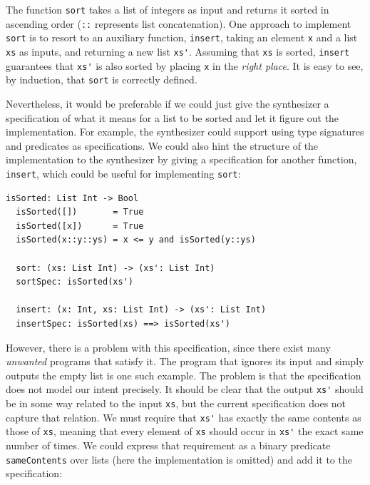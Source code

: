 \noindent
The function \lstinline{sort} takes a list of integers as input and returns
it sorted in ascending order (\lstinline{::} represents list concatenation).
One approach to implement \lstinline{sort} is to resort to an auxiliary
function, \lstinline{insert}, taking an element \lstinline{x} and a list
\lstinline{xs} as inputs, and returning a new list \lstinline{xs'}.
Assuming that \lstinline{xs} is sorted, \lstinline{insert} guarantees that
\lstinline{xs'} is also sorted by placing \lstinline{x} in the \textit{right
  place}.
It is easy to see, by induction, that \lstinline{sort} is correctly defined.

Nevertheless, it would be preferable if we could just give the synthesizer a
specification of what it means for a list to be sorted and let it figure out the
implementation. For example, the synthesizer could support using type signatures
and predicates as specifications. We could also hint the structure of the
implementation to the synthesizer by giving a specification for another
function, \lstinline{insert}, which could be useful for implementing
\lstinline{sort}:

\begin{lstlisting}[xleftmargin=.2\textwidth]
  isSorted: List Int -> Bool
  isSorted([])       = True
  isSorted([x])      = True
  isSorted(x::y::ys) = x <= y and isSorted(y::ys)

  sort: (xs: List Int) -> (xs': List Int)
  sortSpec: isSorted(xs')

  insert: (x: Int, xs: List Int) -> (xs': List Int)
  insertSpec: isSorted(xs) ==> isSorted(xs')
\end{lstlisting}

\noindent
However, there is a problem with this specification, since there exist many
\textit{unwanted} programs that satisfy it.
The program that ignores its input and simply outputs the empty list is one such
example.
The problem is that the specification does not model our intent precisely.
It should be clear that the output \lstinline{xs'} should be in some way related
to the input \lstinline{xs}, but the current specification does not capture that
relation.
We must require that \lstinline{xs'} has exactly the same contents as those of
\lstinline{xs}, meaning that every element of \lstinline{xs} should occur in
\lstinline{xs'} the exact same number of times.
We could express that requirement as a binary predicate \lstinline{sameContents}
over lists (here the implementation is omitted) and add it to the specification:

